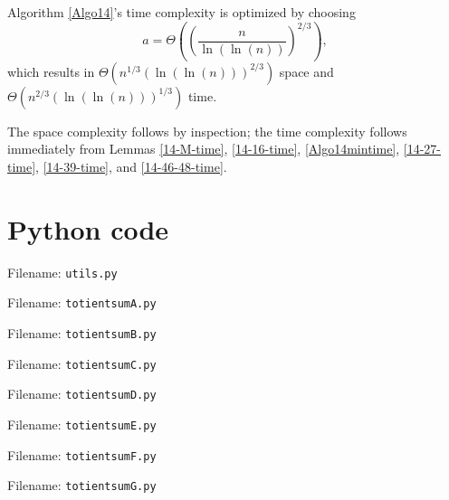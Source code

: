\documentclass[12pt]{article}
\makeatletter
\newcommand{\eqn}[1]{\begin{displaymath} #1 \end{displaymath}}
\newcommand{\floor}[1]{{\left\lfloor #1 \right\rfloor}}
\renewenvironment{proof}[1][\proofname]{\par
  \vspace{-\topsep}%
  \pushQED{\qed}%
  \normalfont
  \topsep0pt \partopsep0pt %
  \trivlist
  \item[\hskip\labelsep
        \itshape
    #1\@addpunct{.}]\ignorespaces
}{%
  \popQED\endtrivlist\@endpefalse
  \addvspace{0pt} %
}
\newcommand{\showcode}[1]{Filename: \texttt{#1.py} }
\newcommand{\isqrt}[1]{\floor{\sqrt{#1}}}
\makeatother
\begin{document}
\begin{theorem} \label{Algo14time}
Algorithm \ref{Algo14}'s time complexity is optimized by choosing
\eqn{a = \Theta\left(\left( \frac{n}{\ln(\ln(n))} \right)^{2/3} \right),}
which results in $\Theta\left(n^{1/3} (\ln(\ln(n)))^{2/3}\right)$ space and $\Theta\left( n^{2/3} (\ln(\ln(n)))^{1/3} \right)$ time.
\end{theorem}
\begin{proof}
The space complexity follows by inspection; the time complexity follows immediately from Lemmas \ref{14-M-time}, \ref{14-16-time}, \ref{Algo14mintime}, \ref{14-27-time}, \ref{14-39-time}, and \ref{14-46-48-time}.
\end{proof}

\section{Python code}


Filename: \texttt{utils.py}

Filename: \texttt{totientsumA.py}
%

Filename: \texttt{totientsumB.py}
%

Filename: \texttt{totientsumC.py}
%

Filename: \texttt{totientsumD.py}
%

Filename: \texttt{totientsumE.py}
%

Filename: \texttt{totientsumF.py}
%

Filename: \texttt{totientsumG.py}
%
\end{document}
